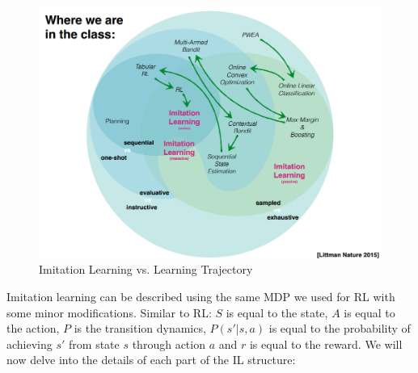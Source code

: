 \documentclass[11pt]{article}
\begin{document}
\begin{figure}[H]
\centering
\includegraphics[width=4.5in]{class.png}
\caption{Imitation Learning vs. Learning Trajectory\cite{RL-circle}} 
\label{img:class}
\end{figure}

Imitation learning can be described using the same MDP we used for RL with some minor modifications. Similar to RL: $S$ is equal to the state, $A$ is equal to the action, $P$ is the transition dynamics, $P(s'|s,a)$ is equal to the probability of achieving $s'$ from state $s$ through action $a$ and $r$ is equal to the reward. We will now delve into the details of each part of the IL structure:
\end{document}
